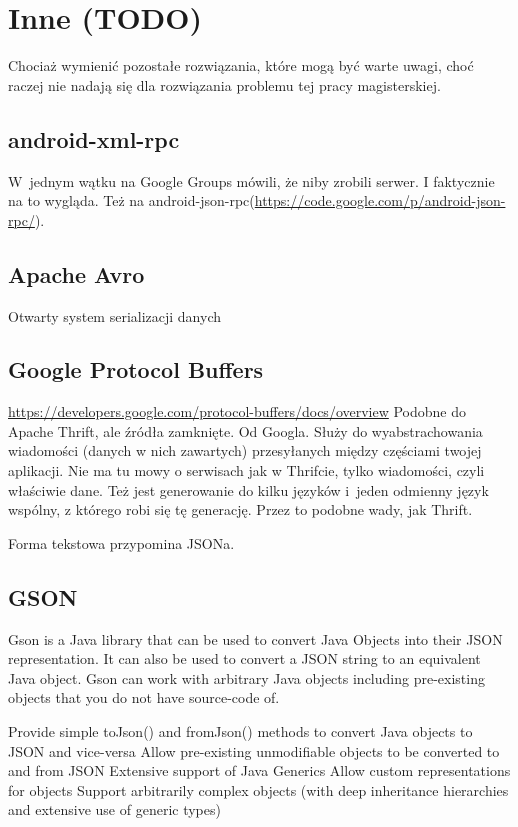 \section{Inne (TODO)}
Chociaż wymienić pozostałe rozwiązania, które mogą być warte uwagi, choć raczej nie nadają się dla rozwiązania problemu tej pracy magisterskiej.

\subsection{android-xml-rpc}
W~jednym wątku na Google Groups \cite{android-rpc-thread} mówili, że niby zrobili serwer. I faktycznie na to wygląda.
Też na android-json-rpc(\url{https://code.google.com/p/android-json-rpc/}).


\subsection{Apache Avro}
Otwarty system serializacji danych


\subsection{Google Protocol Buffers}
\url{https://developers.google.com/protocol-buffers/docs/overview}
Podobne do Apache Thrift, ale źródła zamknięte. Od Googla. Służy do wyabstrachowania wiadomości (danych w nich zawartych) przesyłanych między częściami twojej aplikacji.
Nie ma tu mowy o serwisach jak w Thrifcie, tylko wiadomości, czyli właściwie dane.
Też jest generowanie do kilku języków i~jeden odmienny język wspólny, z którego robi się tę generację. Przez to podobne wady, jak Thrift.

Forma tekstowa przypomina JSONa.


\subsection{GSON}
Gson is a Java library that can be used to convert Java Objects into their JSON representation. It can also be used to convert a JSON string to an equivalent Java object. Gson can work with arbitrary Java objects including pre-existing objects that you do not have source-code of.

Provide simple toJson() and fromJson() methods to convert Java objects to JSON and vice-versa
Allow pre-existing unmodifiable objects to be converted to and from JSON
Extensive support of Java Generics
Allow custom representations for objects
Support arbitrarily complex objects (with deep inheritance hierarchies and extensive use of generic types)

